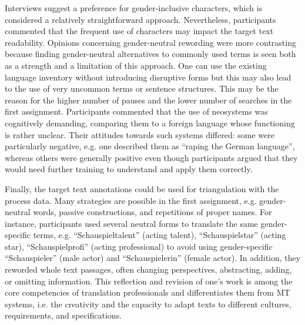 Interviews suggest a preference for gender-inclusive characters, which is considered a relatively straightforward approach. Nevertheless, participants commented that the frequent use of characters may impact the target text readability. Opinions concerning gender-neutral rewording were more contrasting because finding gender-neutral alternatives to commonly used terms is seen both as a strength and a limitation of this approach. One can use the existing language inventory without introducing disruptive forms but this may also lead to the use of very uncommon terms or sentence structures. This may be the reason for the higher number of pauses and the lower number of searches in the first assignment. Participants commented that the use of neosystems was cognitively demanding, comparing them to a foreign language whose functioning is rather unclear. Their attitudes towards such systems differed: some were particularly negative, e.g. one described them as ``raping the German language'', whereas others were generally positive even though participants argued that they would need further training to understand and apply them correctly. 

Finally, the target text annotations could be used for triangulation with the process data. Many strategies are possible in the first assignment, e.g. gender-neutral words, passive constructions, and repetitions of proper names. For instance, participants used several neutral forms to translate the same gender-specific terms, e.g. ``Schauspieltalent'' (acting talent), ``Schauspielstar'' (acting star), ``Schauspielprofi'' (acting professional) to avoid using gender-specific ``Schauspieler'' (male actor) and ``Schauspielerin'' (female actor). In addition, they reworded whole text passages, often changing perspectives, abstracting, adding, or omitting information. This reflection and revision of one's work is among the core competencies of translation professionals and differentiates them from MT systems, i.e. the creativity and the capacity to adapt texts to different cultures, requirements, and specifications. 

